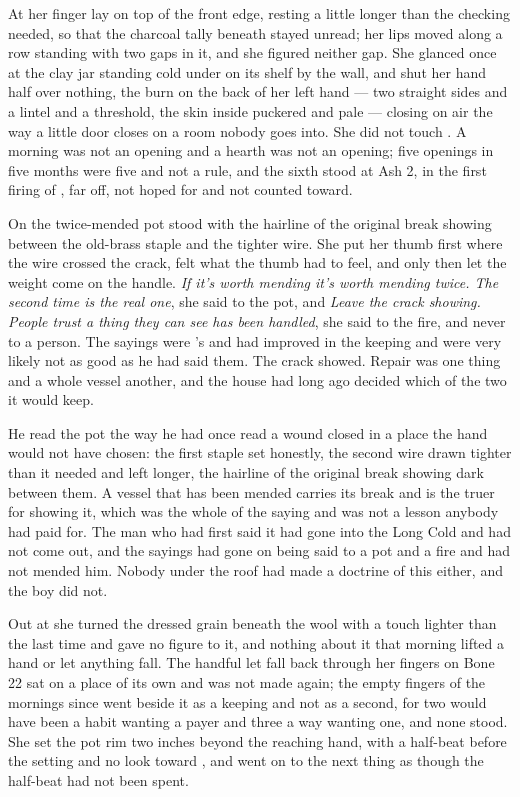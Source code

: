 At  her finger lay on top of the front edge, resting a little longer than the checking needed, so that the charcoal tally beneath stayed unread; her lips moved along a row standing with two gaps in it, and she figured neither gap. She glanced once at the clay jar standing cold under  on its shelf by the wall, and shut her hand half over nothing, the burn on the back of her left hand --- two straight sides and a lintel and a threshold, the skin inside puckered and pale --- closing on air the way a little door closes on a room nobody goes into. She did not touch . A morning was not an opening and a hearth was not an opening; five openings in five months were five and not a rule, and the sixth stood at Ash 2, in the first firing of , far off, not hoped for and not counted toward.

On  the twice-mended pot stood with the hairline of the original break showing between the old-brass staple and the tighter wire. She put her thumb first where the wire crossed the crack, felt what the thumb had to feel, and only then let the weight come on the handle. \emph{If it's worth mending it's worth mending twice. The second time is the real one}, she said to the pot, and \emph{Leave the crack showing. People trust a thing they can see has been handled}, she said to the fire, and never to a person. The sayings were 's and had improved in the keeping and were very likely not as good as he had said them. The crack showed. Repair was one thing and a whole vessel another, and the house had long ago decided which of the two it would keep.

He read the pot the way he had once read a wound closed in a place the hand would not have chosen: the first staple set honestly, the second wire drawn tighter than it needed and left longer, the hairline of the original break showing dark between them. A vessel that has been mended carries its break and is the truer for showing it, which was the whole of the saying and was not a lesson anybody had paid for. The man who had first said it had gone into the Long Cold and had not come out, and the sayings had gone on being said to a pot and a fire and had not mended him. Nobody under the roof had made a doctrine of this either, and the boy did not.

Out at  she turned the dressed grain beneath the wool with a touch lighter than the last time and gave no figure to it, and nothing about it that morning lifted a hand or let anything fall. The handful let fall back through her fingers on Bone 22 sat on a place of its own and was not made again; the empty fingers of the mornings since went beside it as a keeping and not as a second, for two would have been a habit wanting a payer and three a way wanting one, and none stood. She set the pot rim two inches beyond the reaching hand, with a half-beat before the setting and no look toward , and went on to the next thing as though the half-beat had not been spent.


